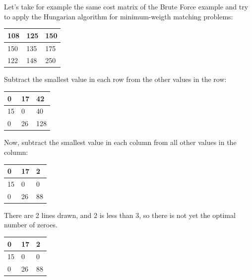 Let's take for example the same cost matrix of the Brute Force example and try to apply the Hungarian algorithm for minimum-weigth matching problems:

\begin{table}[H]
\centering
\begin{tabular}{|m{0.5cm}|m{0.5cm}|m{0.5cm}|}
  \hline
  108 & 125 & 150 \\
  \hline
  150 & 135 & 175 \\
  \hline
  122 & 148 & 250 \\
  \hline
\end{tabular}
\end{table}

Subtract the smallest value in each row from the other values in the row:

\begin{table}[H]
\centering
\begin{tabular}{|m{0.5cm}|m{0.5cm}|m{0.5cm}|}
  \hline
  0 & 17 & 42 \\
  \hline
  15 & 0 & 40 \\
  \hline
  0 & 26 & 128 \\
  \hline
\end{tabular}
\end{table}

Now, subtract the smallest value in each column from all other values in the column:

\begin{table}[H]
\centering
\begin{tabular}{|m{0.5cm}|m{0.5cm}|m{0.5cm}|}
  \hline
  0 & 17 & 2 \\
  \hline
  15 & 0 & 0 \\
  \hline
  0 & 26 & 88 \\
  \hline
\end{tabular}
\end{table}

There are 2 lines drawn, and 2 is less than 3, so there is not yet the optimal number of zeroes.

\begin{table}[H]
\centering
\begin{tabular}{|m{0.5cm}|m{0.5cm}|m{0.5cm}|}
  \hline
  \cellcolor{gray!25} 0 & 17 & 2 \\
  \hline
  \cellcolor{gray!25} 15 & \cellcolor{gray!25} 0 & \cellcolor{gray!25} 0 \\
  \hline
  \cellcolor{gray!25} 0 & 26 & 88 \\
  \hline
\end{tabular}
\end{table}

